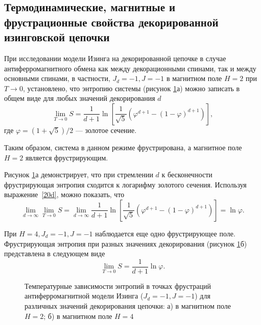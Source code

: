 \subsection{Термодинамические, магнитные и фрустрационные свойства декорированной изинговской цепочки}

При исследовании модели Изинга на декорированной цепочке в случае антиферромагнитного обмена как между декорационными спинами, так и между основными спинами, в частности, \mbox{$J_d=-1, J=-1$} в магнитном поле $H=2$ при $T\rightarrow 0$, установлено, что энтропию системы (рисунок \ref{entropyDecor}а) можно записать в общем виде для любых значений декорирования $d$
\begin{equation}
\lim_{T \rightarrow 0} S = \frac{1}{d+1} \ln \left[\frac{1}{\sqrt{5}}\left(\varphi^{d+1}-(1-\varphi)^{d+1}\right)\right],
\label{20d}
\end{equation}
где $\varphi=(1+\sqrt{5})/2$ --- золотое сечение.

Таким образом, система в данном режиме фрустрирована, а магнитное поле $H = 2$ является фрустрирующим.

Рисунок \ref{entropyDecor}а демонстрирует, что при стремлении $d$ к бесконечности фрустрирующая энтропия сходится к логарифму золотого сечения. Используя выражение~\eqref{20d}, можно показать, что
\begin{equation}
\lim_{d\rightarrow \infty} \lim_{T \rightarrow 0} S = \lim_{d\rightarrow \infty} \frac{1}{d+1} \ln \left[\frac{1}{\sqrt{5}}\left(\varphi^{d+1}-(1-\varphi)^{d+1}\right)\right] = \ln \varphi.
\label{21d}
\end{equation}

При \mbox{$H=4, J_d=-1, J=-1$} наблюдается еще одно фрустрирующее поле. Фрустрирующая энтропия при разных значениях декорирования (рисунок \ref{entropyDecor}б) представлена в следующем виде
\begin{equation}
\lim_{T \rightarrow 0} S = \frac{1}{d+1} \ln \varphi.
\label{22d}
\end{equation}

 \begin{figure}[h]
 	\begin{minipage}{0.49\linewidth}
 	\end{minipage}
 	\hfill
 	\begin{minipage}{0.49\linewidth}
 	\end{minipage}
 	\caption{Температурные зависимости энтропий в точках фрустраций антиферромагнитной модели Изинга ($J_d=-1, J=-1$) для различных значений декорирования цепочки: а) в магнитном поле $H=2$;  б) в магнитном поле $H=4$}
 	\label{entropyDecor}
 \end{figure}

